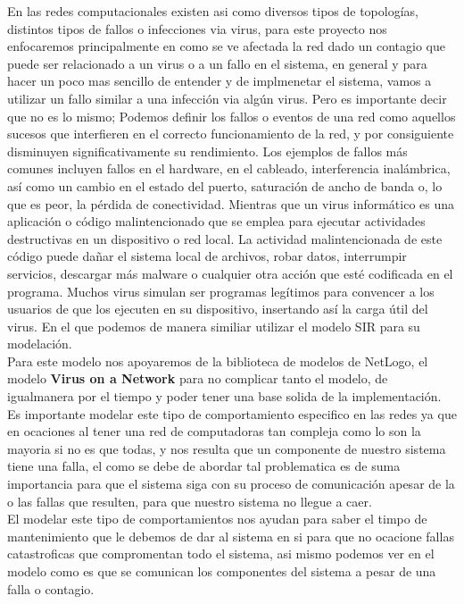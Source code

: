 \documentclass[12pt]{article}
\begin{document}
En las redes computacionales existen asi como diversos tipos de topologías, distintos tipos de fallos o infecciones via virus, para este proyecto nos enfocaremos principalmente en como se ve afectada la red dado un contagio que puede ser relacionado a un virus o a un fallo en el sistema, en general y para hacer un poco mas sencillo de entender y de implmenetar el sistema, vamos a utilizar un fallo similar a una infección via algún virus.
Pero es importante decir que no es lo mismo; Podemos definir los fallos o eventos de una red como aquellos sucesos que interfieren en el correcto funcionamiento de la red, y por consiguiente disminuyen significativamente su rendimiento. Los ejemplos de fallos más comunes incluyen fallos en el hardware, en el cableado, interferencia inalámbrica, así como un cambio en el estado del puerto, saturación de ancho de banda o, lo que es peor, la pérdida de conectividad.
Mientras que un virus informático es una aplicación o código malintencionado que se emplea para ejecutar actividades destructivas en un dispositivo o red local. La actividad malintencionada de este código puede dañar el sistema local de archivos, robar datos, interrumpir servicios, descargar más malware o cualquier otra acción que esté codificada en el programa. Muchos virus simulan ser programas legítimos para convencer a los usuarios de que los ejecuten en su dispositivo, insertando así la carga útil del virus.
En el que podemos de manera similiar utilizar el modelo SIR para su modelación.\\

Para este modelo nos apoyaremos de la biblioteca de modelos de NetLogo, el modelo \textbf{Virus on a Network} para no complicar tanto el modelo, de igualmanera por el tiempo y poder tener una base solida de la implementación.\\
Es importante modelar este tipo de comportamiento especifico en las redes ya que en ocaciones al tener una red de computadoras tan compleja como lo son la mayoria si no es que todas, y nos resulta que un componente de nuestro sistema tiene una falla, 
el como se debe de abordar tal problematica es de suma importancia para que el sistema siga con su proceso de comunicación apesar de la o las fallas que resulten, para que nuestro sistema no llegue a caer.\\

El modelar este tipo de comportamientos nos ayudan para saber el timpo de mantenimiento que le debemos de dar al sistema en si para que no ocacione fallas catastroficas que compromentan todo el sistema, asi mismo podemos ver en el modelo como es que se comunican los componentes del sistema a pesar de una falla o contagio.\\
\end{document}
